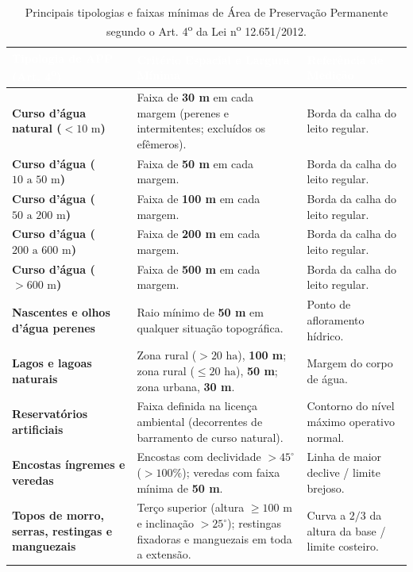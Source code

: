 \begin{table}[H]
\centering
\caption{Principais tipologias e faixas mínimas de Área de Preservação Permanente segundo o Art. 4\textsuperscript{o} da Lei n\textsuperscript{o} 12.651/2012.}
\label{tab:apps_codigo_florestal}
\renewcommand{\arraystretch}{1.18}
\small
\begin{tabularx}{\textwidth}{@{}p{4.3cm} >{\raggedright\arraybackslash}X p{4.2cm}@{}}
  \toprule
  \rowcolor{uefsNavy}
  \textcolor{white}{\bfseries Tipologia de APP (Art. 4\textsuperscript{o})} & \textcolor{white}{\bfseries Critério Espacial e Largura Mínima} & \textcolor{white}{\bfseries Referência de Medição} \\
  \midrule
  \textbf{Curso d'água natural ($< 10\text{ m}$)} & Faixa de \textbf{30 m} em cada margem (perenes e intermitentes; excluídos os efêmeros). & Borda da calha do leito regular. \\
  \rowcolor{bgGray}
  \textbf{Curso d'água ($10\text{ a } 50\text{ m}$)} & Faixa de \textbf{50 m} em cada margem. & Borda da calha do leito regular. \\
  \textbf{Curso d'água ($50\text{ a } 200\text{ m}$)} & Faixa de \textbf{100 m} em cada margem. & Borda da calha do leito regular. \\
  \rowcolor{bgGray}
  \textbf{Curso d'água ($200\text{ a } 600\text{ m}$)} & Faixa de \textbf{200 m} em cada margem. & Borda da calha do leito regular. \\
  \textbf{Curso d'água ($> 600\text{ m}$)} & Faixa de \textbf{500 m} em cada margem. & Borda da calha do leito regular. \\
  \rowcolor{bgGray}
  \textbf{Nascentes e olhos d'água perenes} & Raio mínimo de \textbf{50 m} em qualquer situação topográfica. & Ponto de afloramento hídrico. \\
  \textbf{Lagos e lagoas naturais} & Zona rural ($> 20\text{ ha}$), \textbf{100 m}; zona rural ($\le 20\text{ ha}$), \textbf{50 m}; zona urbana, \textbf{30 m}. & Margem do corpo de água. \\
  \rowcolor{bgGray}
  \textbf{Reservatórios artificiais} & Faixa definida na licença ambiental (decorrentes de barramento de curso natural). & Contorno do nível máximo operativo normal. \\
  \textbf{Encostas íngremes e veredas} & Encostas com declividade $> 45^\circ$ ($> 100\%$); veredas com faixa mínima de \textbf{50 m}. & Linha de maior declive / limite brejoso. \\
  \rowcolor{bgGray}
  \textbf{Topos de morro, serras, restingas e manguezais} & Terço superior (altura $\ge 100\text{ m}$ e inclinação $> 25^\circ$); restingas fixadoras e manguezais em toda a extensão. & Curva a $2/3$ da altura da base / limite costeiro. \\
  \bottomrule
\end{tabularx}
\end{table}

